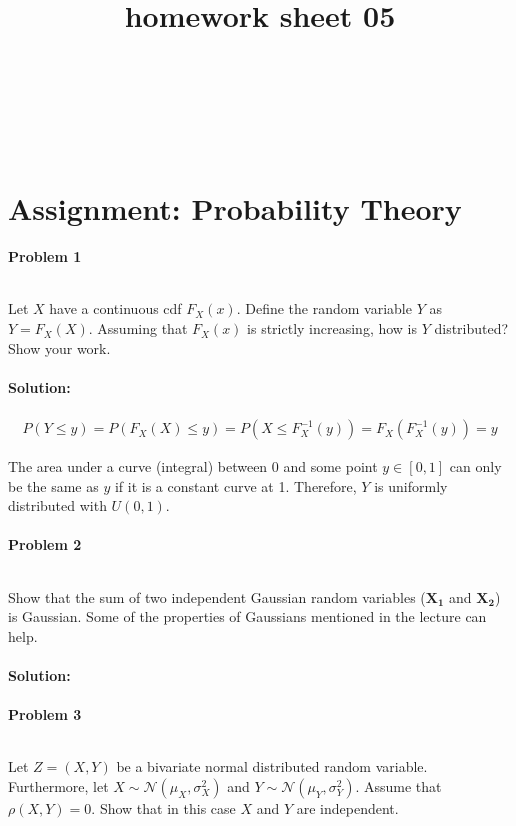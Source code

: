 \documentclass{article}
\title{homework sheet 05}
\author{
\name{Andre Seitz}\\
\imat{03622870}\\
\email{andre.seitz@mytum.de}
\And
\name{Linda Leidig} \\
\imat{03608416}\\
\email{linda.leidig@tum.de}
}
\renewcommand{\Vec}[1]{\ensuremath{\mathbf{#1}}}
\begin{document}
\maketitle

\section{Assignment: Probability Theory}
\paragraph*{Problem 1}
$\;$ 

Let $X$ have a continuous cdf $F_X(x)$. Define the
random variable $Y$ as $Y = F_X(X)$. Assuming that
$F_X(x)$ is strictly increasing, how is $Y$ distributed?
Show your work.

\paragraph*{Solution:}
\begin{eqnarray}
P(Y \leq y) = P(F_X(X) \leq y) = P(X \leq F^{-1}_X(y)) = F_X(F_X^{-1}(y)) = y
\end{eqnarray}

The area under a curve (integral) between 0 and some point $y \in [0,1]$ can only be the same as $y$ if it is a constant curve at 1. Therefore, $Y$ is uniformly distributed with $U(0,1)$.

\paragraph*{Problem 2}
$\;$ 

Show that the sum of two independent Gaussian random variables ($\Vec{X_1}$ and $\Vec{X_2}$) is Gaussian. Some of the properties of Gaussians mentioned in the lecture can help.

\paragraph*{Solution:}




\paragraph*{Problem 3}
$\;$ 

Let $Z = (X, Y)$ be a bivariate normal distributed random variable. Furthermore, let $X \sim \mathcal{N}(\mu_X, \sigma^2_X)$ and $Y \sim \mathcal{N}(\mu_Y, \sigma^2_Y)$. Assume that $\rho(X, Y) = 0$. Show that in this case $X$ and $Y$ are independent.
\end{document}
